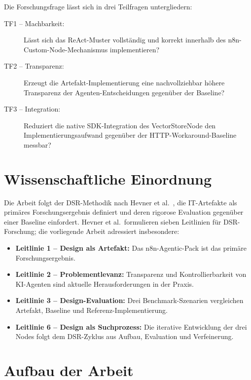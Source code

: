 \documentclass[12pt,a4paper,oneside]{report}
\begin{document}
Die Forschungsfrage lässt sich in drei Teilfragen untergliedern:

\begin{description}
  \item[TF1 -- Machbarkeit:] Lässt sich das ReAct-Muster vollständig und korrekt
    innerhalb des n8n-Custom-Node-Mechanismus implementieren?
  \item[TF2 -- Transparenz:] Erzeugt die Artefakt-Implementierung eine nachvollziehbar
    höhere Transparenz der Agenten-Entscheidungen gegenüber der Baseline?
  \item[TF3 -- Integration:] Reduziert die native SDK-Integration des VectorStoreNode
    den Implementierungsaufwand gegenüber der HTTP-Workaround-Baseline messbar?
\end{description}

\section{Wissenschaftliche Einordnung}

Die Arbeit folgt der \acf{DSR}-Methodik nach Hevner et al.\ \cite{hevner2004design},
die IT-Artefakte als primäres Forschungsergebnis definiert und deren rigorose
Evaluation gegenüber einer Baseline einfordert. Hevner et al.\ formulieren sieben
Leitlinien für DSR-Forschung; die vorliegende Arbeit adressiert insbesondere:

\begin{itemize}
  \item \textbf{Leitlinie 1 -- Design als Artefakt:} Das n8n-Agentic-Pack ist das
    primäre Forschungsergebnis.
  \item \textbf{Leitlinie 2 -- Problementlevanz:} Transparenz und Kontrollierbarkeit
    von KI-Agenten sind aktuelle Herausforderungen in der Praxis.
  \item \textbf{Leitlinie 3 -- Design-Evaluation:} Drei Benchmark-Szenarien vergleichen
    Artefakt, Baseline und Referenz-Implementierung.
  \item \textbf{Leitlinie 6 -- Design als Suchprozess:} Die iterative Entwicklung
    der drei Nodes folgt dem DSR-Zyklus aus Aufbau, Evaluation und Verfeinerung.
\end{itemize}

\section{Aufbau der Arbeit}
\end{document}
